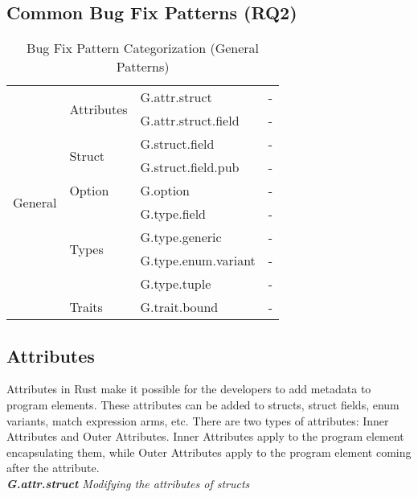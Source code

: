 \subsection{\label{sec:common_patterns}Common Bug Fix Patterns (RQ2)}



\begin{table}[]

\begin{tabular}{|l|l|l|l|}
\hline

\multirow{10}{*}{General}        
& \multirow{2}{*}{Attributes} & G.attr.struct & -                                  \\
& & G.attr.struct.field & -                     \\\cline{2-3}
& \multirow{2}{*}{Struct} & G.struct.field  & -\\
& & G.struct.field.pub & -    
\\\cline{2-3}
& Option & G.option & -                    \\\cline{2-3}
& \multirow{4}{*}{Types} & G.type.field  & - \\
& & G.type.generic & -\\ & & G.type.enum.variant  & - \\
& & G.type.tuple & -                                         \\\cline{2-3}
& \multirow{1}{*}{Traits} & G.trait.bound & - \\ 
\hline
\end{tabular}
\caption{\label{table:general}Bug Fix Pattern Categorization (General Patterns)}
\end{table}
    
    

\subsection{Attributes}

Attributes in Rust make it possible for the developers to add metadata to program elements. These attributes can be added to structs, struct fields, enum variants, match expression arms, etc. There are two types of attributes: Inner Attributes and Outer Attributes. Inner Attributes apply to the program element encapsulating them, while Outer Attributes apply to the program element coming after the attribute. \\

\noindent \textit{\label{sec:G.attr.struct}\textbf{G.attr.struct} Modifying the attributes of structs}

